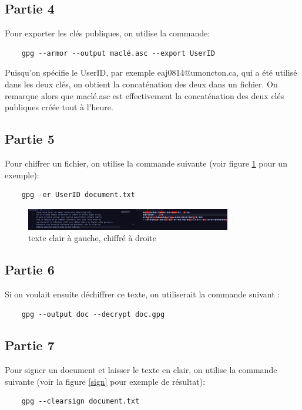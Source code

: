 \documentclass[12pt,a4paper]{article}
\begin{document}
\subsection{Partie 4}
Pour exporter les clés publiques, on utilise la commande:
\begin{verbatim}
    gpg --armor --output maclé.asc --export UserID
\end{verbatim}
Puisqu'on spécifie le UserID, par exemple eaj0814@umoncton.ca,
qui a été utilisé dans les deux clés, on obtient la concaténation des deux dans un fichier.
On remarque alors que maclé.asc est effectivement la concaténation des deux clés publiques créée tout à l'heure.

\subsection{Partie 5}
Pour chiffrer un fichier, on utilise la commande suivante (voir figure \ref{chiffre} pour un exemple):
\begin{verbatim}
    gpg -er UserID document.txt
\end{verbatim}

\begin{figure}[ht]
    \centering
    \includegraphics[width=0.8\textwidth]{../img/chiffre.png}
    \caption{texte clair à gauche, chiffré à droite}
    \label{chiffre}
\end{figure}

\subsection{Partie 6}
Si on voulait ensuite déchiffrer ce texte, on utiliserait la commande suivant :
\begin{verbatim}
    gpg --output doc --decrypt doc.gpg
\end{verbatim}

\subsection{Partie 7}
Pour signer un document et laisser le texte en clair, on utilise la commande suivante (voir la figure \ref{sign} pour exemple de résultat):
\begin{verbatim}
    gpg --clearsign document.txt
\end{verbatim}
\end{document}

